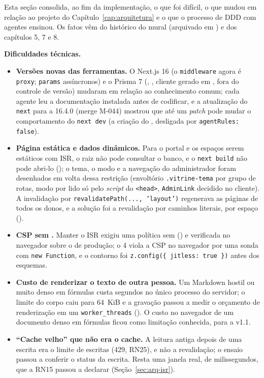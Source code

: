 Esta seção consolida, ao fim da implementação, o que foi difícil, o que mudou em relação ao projeto do Capítulo~\ref{cap:arquitetura} e o que o processo de DDD com agentes ensinou. Os fatos vêm do histórico do mural (arquivado em ) e dos capítulos 5, 7 e 8.

\textbf{Dificuldades técnicas.}
\begin{itemize}
  \item \textbf{Versões novas das ferramentas.} O Next.js 16 (o \texttt{middleware} agora é \texttt{proxy}; \texttt{params} assíncronos) e o Prisma 7 (, , cliente gerado em , fora do controle de versão) mudaram em relação ao conhecimento comum; cada agente leu a documentação instalada antes de codificar, e a atualização do \texttt{next} para a 16.4.0 (merge M-044) mostrou que até um \emph{patch} pode mudar o comportamento do \texttt{next dev} (a criação do , desligada por \texttt{agentRules: false}).
  \item \textbf{Página estática e dados dinâmicos.} Para o portal e os espaços serem estáticos com ISR, o  raiz não pode consultar o banco, e o \texttt{next build} não pode abri-lo (); o tema, o modo e a navegação do administrador foram desenhados em volta dessa restrição (envoltório \texttt{.vitrine-tema} por grupo de rotas, modo por  lido só pelo \emph{script} do \texttt{<head>}, \texttt{AdminLink} decidido no cliente). A invalidação por \texttt{revalidatePath(..., 'layout')} regenerava as páginas de todos os donos, e a solução foi a revalidação por caminhos literais, por espaço ().
  \item \textbf{CSP sem .} Manter o ISR exigiu uma política sem  () e verificada no navegador sobre o  de produção; o  4 viola a CSP no navegador por uma sonda com \texttt{new Function}, e o contorno foi \texttt{z.config(\{ jitless: true \})} antes dos esquemas.
  \item \textbf{Custo de renderizar o texto de outra pessoa.} Um Markdown hostil ou muito denso em fórmulas custa segundos no único processo do servidor; o limite do corpo caiu para 64~KiB e a gravação passou a medir o orçamento de renderização em um \texttt{worker\_threads} (). O custo no navegador de um documento denso em fórmulas ficou como limitação conhecida, para a v1.1.
  \item \textbf{``Cache velho'' que não era o cache.} A leitura antiga depois de uma escrita era o limite de escritas (429, RN25), e não a revalidação; o ensaio passou a conferir o status da escrita. Resta uma janela real, de milissegundos, que a RN15 passou a declarar (Seção~\ref{sec:arq-isr}).

\end{itemize}
